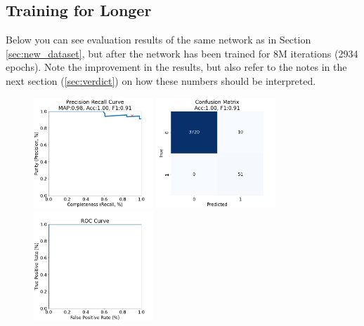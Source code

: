 \documentclass[DM,authoryear,toc]{lsstdoc}
\begin{document}
\clearpage
\subsection{Training for Longer}
\label{sec:longer}
Below you can see evaluation results of the same network as in Section \ref{sec:new_dataset}, but after the network has been trained for 8M iterations (2934 epochs). Note the improvement in the results, but also refer to the notes in the next section (\ref{sec:verdict}) on how these numbers should be interpreted.

\begin{figure}[h]
  \centering
  \includegraphics[width=0.4\textwidth]{precrec_13-resnet50-FullAugmentation-scratch-B64_epoch0002934_iter8000000__npy_data_0.1.2-6sigma_256by256__posw_1.png}
  \includegraphics[width=0.4\textwidth]{confmat_13-resnet50-FullAugmentation-scratch-B64_epoch0002934_iter8000000__npy_data_0.1.2-6sigma_256by256__posw_1.png}
  \includegraphics[width=0.4\textwidth]{roc_13-resnet50-FullAugmentation-scratch-B64_epoch0002934_iter8000000__npy_data_0.1.2-6sigma_256by256__posw_1.png}

\end{figure}
\end{document}
